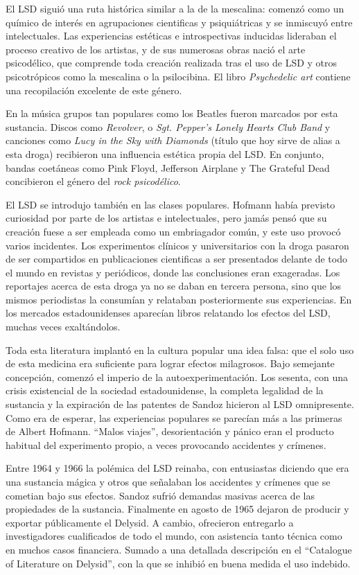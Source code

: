 El LSD siguió una ruta histórica similar a la de la mescalina: comenzó como un químico de interés en agrupaciones cientificas y psiquiátricas y se inmiscuyó entre intelectuales. Las experiencias estéticas e introspectivas inducidas lideraban el proceso creativo de los artistas, y de sus numerosas obras nació el arte psicodélico, que comprende toda creación realizada tras el uso de LSD y otros psicotrópicos como la mescalina o la psilocibina. El libro \textit{Psychedelic art} contiene una recopilación excelente de este género.

En la música grupos tan populares como los Beatles fueron marcados por esta sustancia. Discos como \textit{Revolver}, o \textit{Sgt. Pepper’s Lonely Hearts Club Band} y canciones como \textit{Lucy in the Sky with Diamonds} (título que hoy sirve de alias a esta droga) recibieron una influencia estética propia del LSD. En conjunto, bandas coetáneas como Pink Floyd, Jefferson Airplane y The Grateful Dead concibieron el género del \textit{rock psicodélico}.

El LSD se introdujo también en las clases populares. Hofmann había previsto curiosidad por parte de los artistas e intelectuales, pero jamás pensó que su creación fuese a ser empleada como un embriagador común, y este uso provocó varios incidentes. Los experimentos clínicos y universitarios con la droga pasaron de ser compartidos en publicaciones cientificas a ser presentados delante de todo el mundo en revistas y periódicos, donde las conclusiones eran exageradas. Los reportajes acerca de esta droga ya no se daban en tercera persona, sino que los mismos periodistas la consumían y relataban posteriormente sus experiencias. En los mercados estadounidenses aparecían libros relatando los efectos del LSD, muchas veces exaltándolos.

Toda esta literatura implantó en la cultura popular una idea falsa: que el solo uso de esta medicina era suficiente para lograr efectos milagrosos. Bajo semejante concepción, comenzó el imperio de la autoexperimentación. Los sesenta, con una crisis existencial de la sociedad estadounidense, la completa legalidad de la sustancia y la expiración de las patentes de Sandoz hicieron al LSD omnipresente. Como era de esperar, las experiencias populares se parecían más a las primeras de Albert Hofmann. \enquote{Malos viajes}, desorientación y pánico eran el producto habitual del experimento propio, a veces provocando accidentes y crímenes.

Entre 1964 y 1966 la polémica del LSD reinaba, con entusiastas diciendo que era una sustancia mágica y otros que señalaban los accidentes y crímenes que se cometian bajo sus efectos. Sandoz sufrió demandas masivas acerca de las propiedades de la sustancia. Finalmente en agosto de 1965 dejaron de producir y exportar públicamente el Delysid. A cambio, ofrecieron entregarlo a investigadores cualificados de todo el mundo, con asistencia tanto técnica como en muchos casos financiera. Sumado a una detallada descripción en el \enquote{Catalogue of Literature on Delysid}, con la que se inhibió en buena medida el uso indebido.

